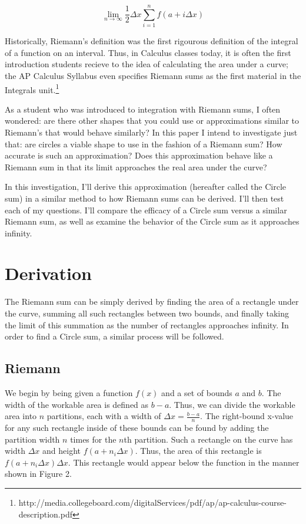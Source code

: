 \documentclass{article}
\begin{document}
    \[ \displaystyle\lim_{n \to \infty}\frac{1}{2}\Delta x\sum_{i=1}^n f(a+i\Delta x) \]

    Historically, Riemann's definition was the first rigourous definition of the
    integral of a function on an interval. Thus, in Calculus classes today, it is often
    the first introduction students recieve to the idea of calculating the area
    under a curve; the AP Calculus Syllabus even specifies Riemann sums as the
    first material in the Integrals unit.\footnote{http://media.collegeboard.com/digitalServices/pdf/ap/ap-calculus-course-description.pdf}

    As a student who was introduced to integration with Riemann sums, I often
    wondered: are there other shapes that you could use or approximations similar
    to Riemann's that would behave similarly? In this paper I intend to
    investigate just that: are circles a viable shape to use in the fashion of
    a Riemann sum? How accurate is such an approximation? Does this approximation
    behave like a Riemann sum in that its limit approaches the real area under
    the curve?

    In this investigation, I'll derive this approximation (hereafter called the
     Circle sum) in a similar method to how Riemann sums can be derived.
    I'll then test each of my questions. I'll compare the efficacy of a Circle
    sum versus a similar Riemann sum, as well as examine the behavior of the Circle
    sum as it approaches infinity.

  \section{Derivation}
    The Riemann sum can be simply derived by finding the area of a rectangle under
    the curve, summing all such rectangles between two bounds, and finally taking
    the limit of this summation as the number of rectangles approaches infinity.
    In order to find a Circle sum, a similar process will be followed.

    \subsection{Riemann}
      We begin by being given a function \( f(x) \) and a set of bounds \( a \) and
      \( b \). The width of the workable area is defined as \( b-a \). Thus, we can
      divide the workable area into \( n \) partitions, each with a width of \( \Delta x = \frac{b-a}{n} \).
      The right-bound x-value for any such rectangle inside of these bounds can be
      found by adding the partition width \( n \) times for the \(n\)th partition.
      Such a rectangle on the curve has width \( \Delta x \) and height
      \( f(a+n_i\Delta x) \). Thus, the area of this rectangle is \( f(a+n_i\Delta x)\Delta x \).
      This rectangle would appear below the function in the manner shown in Figure 2.
\end{document}

